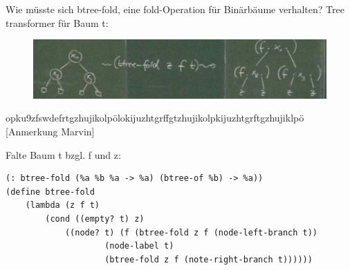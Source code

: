 \documentclass[a4paper, 20pt, openany]{book}
\begin{document}
Wie müsste sich btree-fold, eine fold-Operation für Binärbäume verhalten? Tree transformer für Baum t:

\begin{figure}[ht]
	\centering
  \includegraphics[width=1\textwidth, angle=0]{btree-fold.jpg}
	\label{fig1}
\end{figure}

opku9zfswdefrtgzhujikolpölokijuzhtgrffgtzhujikolpkijuzhtgrftgzhujiklpö [Anmerkung Marvin]

Falte Baum t bzgl. f und z:\\
\begin{lstlisting}
(: btree-fold (%a %b %a -> %a) (btree-of %b) -> %a))
(define btree-fold
	(lambda (z f t)
		(cond ((empty? t) z)
			((node? t) (f (btree-fold z f (node-left-branch t))
					(node-label t)
					(btree-fold z f (note-right-branch t))))))
\end{lstlisting}
\end{document}
